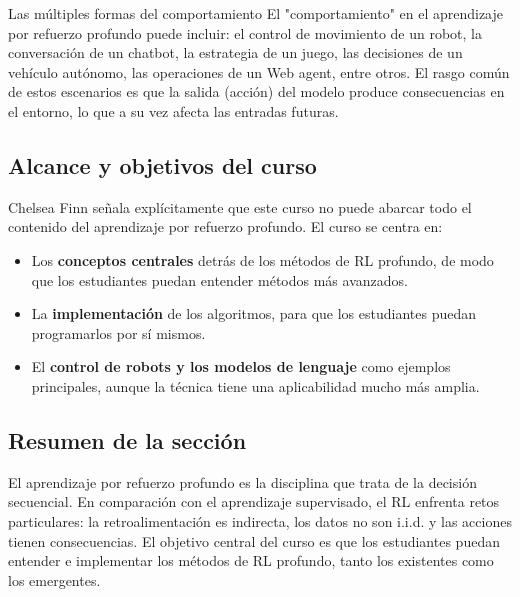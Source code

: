 \begin{knowledgebox}{Las múltiples formas del comportamiento}
El "comportamiento" en el aprendizaje por refuerzo profundo puede incluir: el control de movimiento de un robot, la conversación de un chatbot, la estrategia de un juego, las decisiones de un vehículo autónomo, las operaciones de un Web agent, entre otros. El rasgo común de estos escenarios es que la salida (acción) del modelo produce consecuencias en el entorno, lo que a su vez afecta las entradas futuras.
\end{knowledgebox}

\subsection{Alcance y objetivos del curso}

Chelsea Finn señala explícitamente que este curso no puede abarcar todo el contenido del aprendizaje por refuerzo profundo. El curso se centra en:
\begin{itemize}
    \item Los \textbf{conceptos centrales} detrás de los métodos de RL profundo, de modo que los estudiantes puedan entender métodos más avanzados.
    \item La \textbf{implementación} de los algoritmos, para que los estudiantes puedan programarlos por sí mismos.
    \item El \textbf{control de robots y los modelos de lenguaje} como ejemplos principales, aunque la técnica tiene una aplicabilidad mucho más amplia.
\end{itemize}

\subsection{Resumen de la sección}

El aprendizaje por refuerzo profundo es la disciplina que trata de la decisión secuencial. En comparación con el aprendizaje supervisado, el RL enfrenta retos particulares: la retroalimentación es indirecta, los datos no son i.i.d. y las acciones tienen consecuencias. El objetivo central del curso es que los estudiantes puedan entender e implementar los métodos de RL profundo, tanto los existentes como los emergentes.
